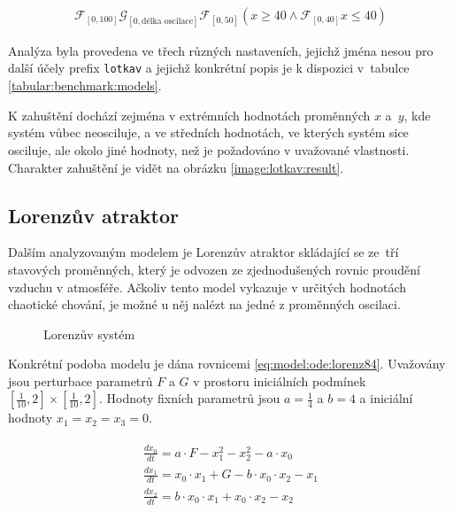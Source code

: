 \begin{align}
\label{eq:model:stl:lotkav}
\mathcal{F}_{[0, 100]}\mathcal{G}_{[0, \textrm{délka oscilace}]}\mathcal{F}_{[0, 50]}(x \geq 40 \wedge \mathcal{F}_{[0, 40]}x \leq 40)
\end{align}

Analýza byla provedena ve třech různých nastaveních, jejichž jména nesou pro další účely prefix \texttt{lotkav}
a jejichž konkrétní popis je k dispozici v~ta\-bul\-ce \ref{tabular:benchmark:models}.

K zahuštění dochází zejména v extrémních hodnotách pro\-měn\-ných $x$ a~$y$, kde systém vůbec neosciluje,
a ve středních hodnotách, ve kterých systém sice osciluje, ale okolo jiné hodnoty, než je požadováno v uvažované vlastnosti.
Charakter zahuštění je vidět na obrázku \ref{image:lotkav:result}. 


\subsection{Lorenzův atraktor}

Dalším analyzovaným modelem je Lorenzův atraktor \cite{lorenz2010} skládající se
ze~tří stavových proměnných, který je odvozen ze zjednodušených rovnic prou\-dě\-ní
vzduchu v atmosféře. Ačkoliv tento model vykazuje v určitých hodnotách chaotické chování,
je možné u něj nalézt na jedné z proměnných oscilaci.

\begin{figure}[h!]
\begin{center}
\caption{Lorenzův systém}
\end{center}
\end{figure}

Konkrétní podoba modelu je dána rovnicemi \ref{eq:model:ode:lorenz84}. Uvažovány jsou perturbace
parametrů $F$ a $G$ v prostoru iniciálních podmínek $[\frac{1}{10}, 2] \times [\frac{1}{10}, 2]$.
Hodnoty fixních parametrů jsou $a = \frac{1}{4}$ a $b = 4$ a iniciální hodnoty $x_1 = x_2 = x_3 = 0$.

\begin{align}\label{eq:model:ode:lorenz84}
\begin{array}{ll}
\frac{dx_0}{dt} = a \cdot F - x_1^2 - x_2^2 - a \cdot x_0				\\
\frac{dx_1}{dt} = x_0 \cdot x_1 + G - b \cdot x_0 \cdot x_2 - x_1			\\
\frac{dx_2}{dt} = b \cdot x_0 \cdot x_1 + x_0 \cdot x_2 - x_2				\\
\end{array}
\end{align}

